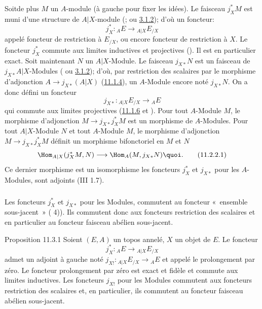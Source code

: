 \subsubsection{}
Soit\pageoriginale de plus $M$ un $A$-module (à gauche pour fixer
les idées). Le faisceau $j^{\ast}_XM$ est muni d'une structure de
$A| X$-module (; ou \hyperref[IV.subsubsec3.1.2]{3.1.2}); d'où
un foncteur:
$$
j^{\ast}_X:{}_AE\longrightarrow {}_{A| X}E_{/X}
$$
appelé foncteur de restriction à $E_{/X}$, ou encore foncteur de
restriction à $X$. Le foncteur $j^{\ast}_X$ commute aux limites
inductives et projectives (\loccit). Il est en particulier exact.
Soit maintenant $N$ un $A| X$-Module. Le faisceau $j_{X\ast}N$ est
un faisceau de $j_{X\ast}A| X$-Modules ( ou 
\hyperref[IV.subsubsec3.1.2]{3.1.2}); d'où, par restriction des scalaires par le
morphisme d'adjonction $A\rightarrow j_{X\ast}(A| X)$
(\hyperref[IV.subsubsec11.1.4]{11.1.4}), un $A$-Module encore noté
$j_{X\ast}N$. On a donc défini un foncteur
$$
j_{X\ast}:{}_{A| X}E_{/X}\longrightarrow {}_AE
$$
qui commute aux limites projectives (\hyperref[IV.prop11.1.6]{11.1.6} et
). Pour tout $A$-Module $M$, le morphisme
d'adjonction $M\rightarrow j_{X\ast}j^{\ast}_XM$ est un morphisme de
$A$-Modules. Pour tout $A| X$-Module $N$ et tout $A$-Module $M$, le
morphisme d'adjonction $M\rightarrow j_{X\ast}j^{\ast}_XM$ définit
un morphisme bifonctoriel en $M$ et $N$
\begin{equation*}
\Hom_{A| X}(j^{\ast}_XM,N)\longrightarrow
\Hom_A(M,j_{X\ast}N){\quoi}.\tag{11.2.2.1}
\end{equation*}
Ce dernier morphisme est un isomorphisme \ie les foncteurs
$j^{\ast}_X$ et $j_{X\ast}$ pour les $A$-Modules, sont adjoints (III
1.7).

\subsubsection{}
Les foncteurs $j^{\ast}_X$ et $j_{X\ast}$ pour les Modules,
commutent au foncteur « ensemble sous-jacent »
( 4)). Ils commutent donc aux foncteurs restriction
des scalaires et en particulier au foncteur faisceau abélien
sous-jacent.

\setcounter{subsection}{3} \setcounter{subsubsection}{0}
\begin{enonce*}{Proposition 11.3.1}
Soient $(E,A)$ un topos annelé, $X$ un objet de $E$. Le foncteur
$$
j^{\ast}_X:{}_{A}E\longrightarrow {}_{A| X}E_{/X}
$$
admet un adjoint à gauche noté $j_{X!}:{}_{A| X}E_{/X}\rightarrow
{}_{A}E$ et appelé le prolongement par zéro. Le foncteur
prolongement par zéro est exact et fidèle et commute aux limites
inductives. Les foncteurs $j_{X!}$ pour les Modules\pageoriginale
commutent aux foncteurs restriction des scalaires et, en
particulier, ils commutent au foncteur faisceau abélien sous-jacent.
\end{enonce*}

